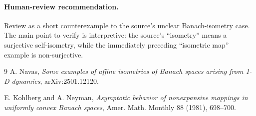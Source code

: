 \documentclass[11pt]{article}
\begin{document}
\paragraph{Human-review recommendation.}
Review as a short counterexample to the source's unclear Banach-isometry
case.  The main point to verify is interpretive: the source's ``isometry''
means a surjective self-isometry, while the immediately preceding
``isometric map'' example is non-surjective.

\begin{thebibliography}{9}
A. Navas,
\emph{Some examples of affine isometries of Banach spaces arising from 1-D
dynamics},
arXiv:2501.12120.

E. Kohlberg and A. Neyman,
\emph{Asymptotic behavior of nonexpansive mappings in uniformly convex Banach
spaces},
Amer. Math. Monthly 88 (1981), 698--700.
\end{thebibliography}
\end{document}
